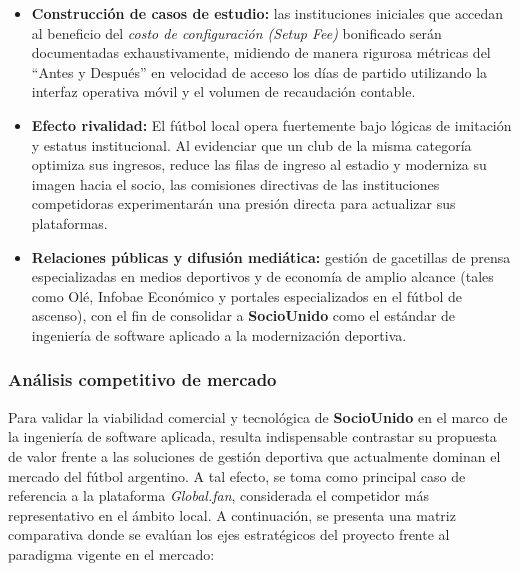 \begin{itemize}
    \item \textbf{Construcción de casos de estudio:} las instituciones iniciales que accedan al beneficio del \textit{costo de configuración (Setup Fee)} bonificado serán documentadas exhaustivamente, midiendo de manera rigurosa métricas del ``Antes y Después'' en velocidad de acceso los días de partido utilizando la interfaz operativa móvil y el volumen de recaudación contable.
    \newpage
    \item \textbf{Efecto rivalidad:} El fútbol local opera fuertemente bajo lógicas de imitación y estatus institucional. Al evidenciar que un club de la misma categoría optimiza sus ingresos, reduce las filas de ingreso al estadio y moderniza su imagen hacia el socio, las comisiones directivas de las instituciones competidoras experimentarán una presión directa para actualizar sus plataformas.
    \item \textbf{Relaciones públicas y difusión mediática:} gestión de gacetillas de prensa especializadas en medios deportivos y de economía de amplio alcance (tales como Olé, Infobae Económico y portales especializados en el fútbol de ascenso), con el fin de consolidar a \textbf{SocioUnido} como el estándar de ingeniería de software aplicado a la modernización deportiva.
\end{itemize}

\subsubsection{Análisis competitivo de mercado}

Para validar la viabilidad comercial y tecnológica de \textbf{SocioUnido} en el marco de la ingeniería de software aplicada, resulta indispensable contrastar su propuesta de valor frente a las soluciones de gestión deportiva que actualmente dominan el mercado del fútbol argentino. A tal efecto, se toma como principal caso de referencia a la plataforma \textit{Global.fan}, considerada el competidor más representativo en el ámbito local. A continuación, se presenta una matriz comparativa donde se evalúan los ejes estratégicos del proyecto frente al paradigma vigente en el mercado:

